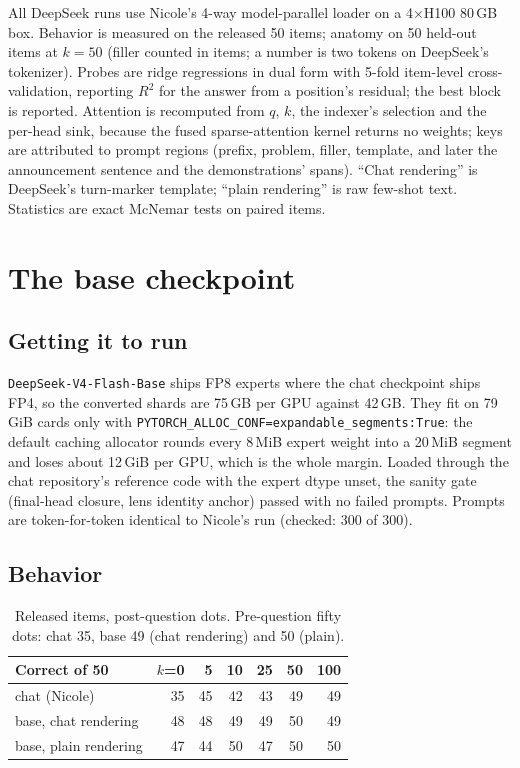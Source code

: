 \documentclass[11pt]{article}
\newcommand{\ttt}[1]{\texttt{\small #1}}
\begin{document}
All DeepSeek runs use Nicole's 4-way model-parallel loader on a 4$\times$H100 80\,GB box. Behavior is measured on the released 50 items; anatomy on 50 held-out items at $k=50$ (filler counted in items; a number is two tokens on DeepSeek's tokenizer). Probes are ridge regressions in dual form with 5-fold item-level cross-validation, reporting $R^2$ for the answer from a position's residual; the best block is reported. Attention is recomputed from $q$, $k$, the indexer's selection and the per-head sink, because the fused sparse-attention kernel returns no weights; keys are attributed to prompt regions (prefix, problem, filler, template, and later the announcement sentence and the demonstrations' spans). ``Chat rendering'' is DeepSeek's turn-marker template; ``plain rendering'' is raw few-shot text. Statistics are exact McNemar tests on paired items.

\section{The base checkpoint}

\subsection{Getting it to run}

\ttt{DeepSeek-V4-Flash-Base} ships FP8 experts where the chat checkpoint ships FP4, so the converted shards are 75\,GB per GPU against 42\,GB. They fit on 79\,GiB cards only with \ttt{PYTORCH\_ALLOC\_CONF=expandable\_segments:True}: the default caching allocator rounds every 8\,MiB expert weight into a 20\,MiB segment and loses about 12\,GiB per GPU, which is the whole margin. Loaded through the chat repository's reference code with the expert dtype unset, the sanity gate (final-head closure, lens identity anchor) passed with no failed prompts. Prompts are token-for-token identical to Nicole's run (checked: 300 of 300).

\subsection{Behavior}

\begin{table}[h]\centering\small
\begin{tabular}{lrrrrrr}\toprule
Correct of 50 & $k$=0 & 5 & 10 & 25 & 50 & 100 \\ \midrule
chat (Nicole) & 35 & 45 & 42 & 43 & 49 & 49 \\
base, chat rendering & 48 & 48 & 49 & 49 & 50 & 49 \\
base, plain rendering & 47 & 44 & 50 & 47 & 50 & 50 \\ \bottomrule
\end{tabular}
\caption{Released items, post-question dots. Pre-question fifty dots: chat 35, base 49 (chat rendering) and 50 (plain).}\end{table}
\end{document}
